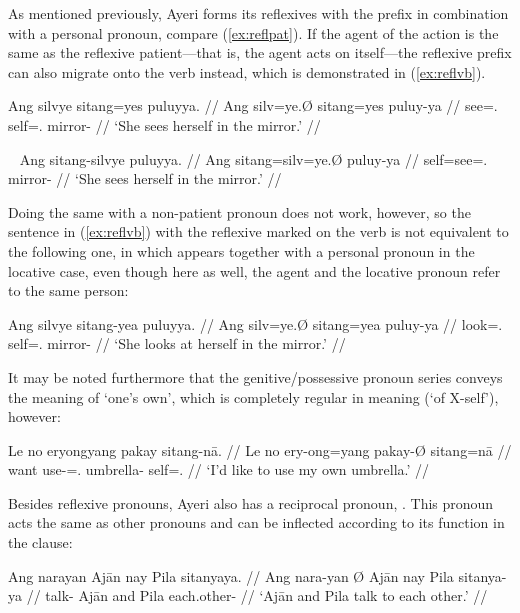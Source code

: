 As mentioned previously, Ayeri forms its reflexives with the prefix 
 in combination with a personal pronoun, compare 
(\ref{ex:reflpat}). If the agent of the action is the same as the reflexive 
patient---that is, the agent acts on itself---the reflexive prefix can also 
migrate onto the verb instead, which is demonstrated in (\ref{ex:reflvb}).

\ex\label{ex:reflpat}\begingl
	\gla Ang silvye sitang=yes puluyya. //
	\glb Ang silv=ye.Ø sitang=yes puluy-ya //
	\glc \AgtT{} see=\TsgF{}.\Top{} self=\TsgF{}.\Parg{} mirror-\Loc{} //
	\glft `She sees herself in the mirror.' //
\endgl\xe

\ex~\label{ex:reflvb}\begingl
	\gla Ang sitang-silvye puluyya. //
	\glb Ang sitang=silv=ye.Ø puluy-ya //
	\glc \AgtT{} self=see=\TsgF{}.\Top{} mirror-\Loc{} //
	\glft `She sees herself in the mirror.' //
\endgl\xe

Doing the same with a non-patient pronoun does not work, however, so the 
sentence in (\ref{ex:reflvb}) with the reflexive  marked 
on the verb is not equivalent to the following one, in which 
 appears together with a personal pronoun in the locative 
case, even though here as well, the agent and the locative pronoun refer to the 
same person:

\ex\label{ex:reflloc}\begingl
	\gla Ang silvye sitang-yea puluyya. //
	\glb Ang silv=ye.Ø sitang=yea puluy-ya //
	\glc \AgtT{} look=\TsgF{}.\Top{} self=\TsgF{}.\Loc{} mirror-\Loc{} //
	\glft `She looks at herself in the mirror.' //
\endgl\xe

It may be noted furthermore that the genitive/possessive pronoun series conveys 
the meaning of `one's own', which is completely regular in meaning (`of 
X-self'), however:

\ex\begingl
	\gla Le no eryongyang pakay sitang-nā. //
	\glb Le no ery-ong=yang pakay-Ø sitang=nā //
	\glc \PatTI{} want use-\Irr{}=\Fsg{}.\Aarg{} umbrella-\Top{} 
		self=\Fsg{}.\Gen{} //
	\glft `I'd like to use my own umbrella.' //
\endgl\xe



Besides reflexive pronouns, Ayeri also has a reciprocal pronoun, 
. This pronoun acts the same as other pronouns 
and can be inflected according to its function in the clause:

\pex
\a\begingl
	\gla Ang narayan {} Ajān nay Pila sitanyaya. //
	\glb Ang nara-yan Ø Ajān nay Pila sitanya-ya //
	\glc \AgtT{} talk-\TplM{} \Top{} Ajān and Pila each.other-\Loc{} //
	\glft `Ajān and Pila talk to each other.' //
\endgl

